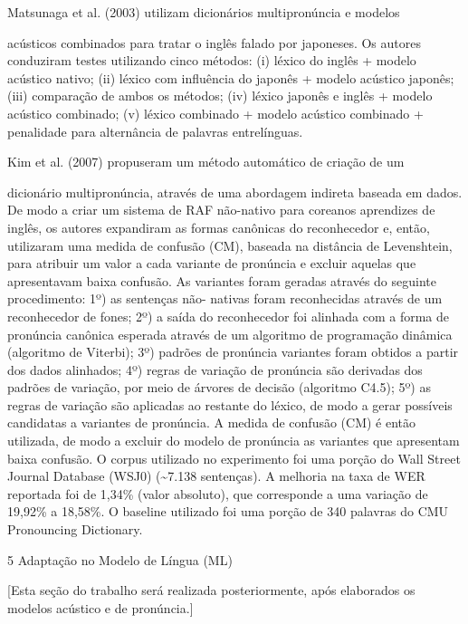   Matsunaga et al. (2003) utilizam dicion\'arios multipron\'uncia e  modelos

ac\'usticos combinados para tratar o ingl\^es falado por japoneses. Os
autores conduziram testes utilizando cinco m\'etodos: (i) l\'exico do ingl\^es
+ modelo ac\'ustico nativo; (ii) l\'exico com influ\^encia do japon\^es + modelo
ac\'ustico japon\^es; (iii) compara\c{c}\~ao de ambos os m\'etodos; (iv) l\'exico
japon\^es e ingl\^es + modelo ac\'ustico combinado; (v) l\'exico combinado +
modelo ac\'ustico combinado + penalidade para altern\^ancia de palavras
entrel\'inguas.

  Kim et al. (2007) propuseram um m\'etodo autom\'atico  de  cria\c{c}\~ao  de  um

dicion\'ario multipron\'uncia, atrav\'es de uma abordagem indireta baseada em
dados. De modo a criar um sistema de RAF n\~ao-nativo para coreanos
aprendizes de ingl\^es, os autores expandiram as formas can\^onicas do
reconhecedor e, ent\~ao, utilizaram uma medida de confus\~ao (CM), baseada
na dist\^ancia de Levenshtein, para atribuir um valor a cada variante de
pron\'uncia e excluir aquelas que apresentavam baixa confus\~ao. As
variantes foram geradas atrav\'es do seguinte procedimento: 1º) as
senten\c{c}as n\~ao- nativas foram reconhecidas atrav\'es de um reconhecedor de
fones; 2º) a sa\'ida do reconhecedor foi alinhada com a forma de pron\'uncia
can\^onica esperada atrav\'es de um algoritmo de programa\c{c}\~ao din\^amica
(algoritmo de Viterbi); 3º) padr\~oes de pron\'uncia variantes foram obtidos
a partir dos dados alinhados; 4º) regras de varia\c{c}\~ao de pron\'uncia s\~ao
derivadas dos padr\~oes de varia\c{c}\~ao, por meio de \'arvores de decis\~ao
(algoritmo C4.5); 5º) as regras de varia\c{c}\~ao s\~ao aplicadas ao restante do
l\'exico, de modo a gerar poss\'iveis candidatas a variantes de pron\'uncia. A
medida de confus\~ao (CM) \'e ent\~ao utilizada, de modo a excluir do modelo
de pron\'uncia as variantes que apresentam baixa confus\~ao. O corpus
utilizado no experimento foi uma por\c{c}\~ao do Wall Street Journal Database
(WSJ0) (\textasciitilde{}7.138 senten\c{c}as). A melhoria na taxa de WER
reportada foi de 1,34\% (valor absoluto), que corresponde a uma varia\c{c}\~ao
de 19,92\% a 18,58\%. O baseline utilizado foi uma por\c{c}\~ao de 340
palavras do CMU Pronouncing Dictionary.

5 Adapta\c{c}\~ao no Modelo de L\'ingua (ML)

{[}Esta se\c{c}\~ao do trabalho ser\'a realizada posteriormente, ap\'os elaborados
os modelos ac\'ustico e de pron\'uncia.{]}

